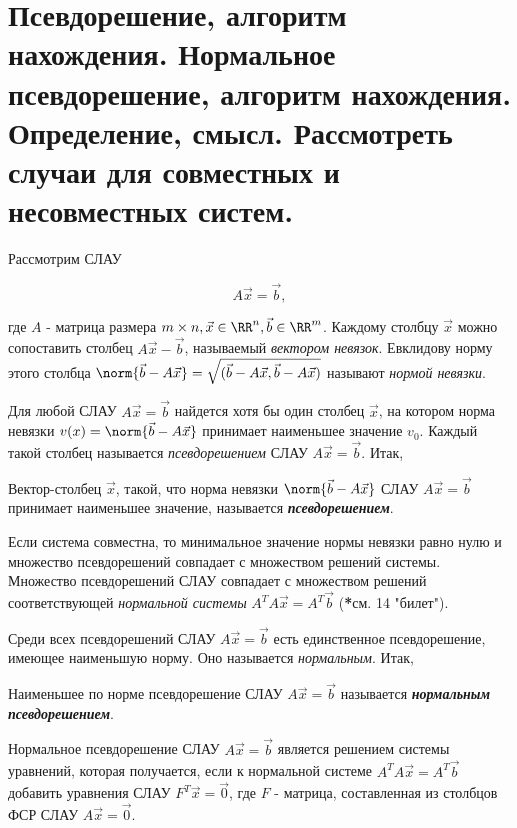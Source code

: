 \section{
    Псевдорешение, алгоритм нахождения. Нормальное псевдорешение, алгоритм нахождения. Определение, смысл. Рассмотреть случаи для совместных и несовместных систем.
}

Рассмотрим СЛАУ 

$$A\vec{x} = \vec{b},$$

где $A$ - матрица размера $m \times n, \vec{x} \in \RR^n, \vec{b} \in \RR^m$. Каждому столбцу $\vec{x}$ можно сопоставить столбец $A\vec{x} - \vec{b}$, называемый \textit{вектором невязок}. Евклидову норму этого столбца $\norm{\vec{b} - A\vec{x}} = \sqrt{(\vec{b} - A\vec{x}, \vec{b} - A\vec{x})}$ называют \textit{нормой невязки}.

Для любой СЛАУ $A\vec{x} = \vec{b}$ найдется хотя бы один столбец $\vec{x}$, на котором норма невязки $v(x) = \norm{\vec{b} - A\vec{x}}$ принимает наименьшее значение $v_0$. Каждый такой столбец называется \textit{псевдорешением} СЛАУ $A\vec{x} = \vec{b}$. Итак,

\begin{definition}
    Вектор-столбец $\vec{x}$, такой, что норма невязки $\norm{\vec{b} - A\vec{x}}$ СЛАУ $A\vec{x} = \vec{b}$ принимает наименьшее значение, называется \textit{\textbf{псевдорешением}}.
\end{definition}

Если система совместна, то минимальное значение нормы невязки равно нулю и множество псевдорешений совпадает с множеством решений системы. Множество псевдорешений СЛАУ совпадает с множеством решений соответствующей \textit{нормальной системы} $A^TA\vec{x} = A^T\vec{b}$ (\textbf{*}см. 14 "билет"). 

Среди всех псевдорешений СЛАУ $A\vec{x} = \vec{b}$ есть единственное псевдорешение, имеющее наименьшую норму. Оно называется \textit{нормальным}. Итак,

\begin{definition}
    Наименьшее по норме псевдорешение СЛАУ $A\vec{x} = \vec{b}$ называется \textbf{\textit{нормальным псевдорешением}}.
\end{definition}

Нормальное псевдорешение СЛАУ $A\vec{x} = \vec{b}$ является решением системы уравнений, которая получается, если к нормальной системе $A^TA\vec{x} = A^T\vec{b}$ добавить уравнения СЛАУ $F^T\vec{x} = \vec{0}$, где $F$ - матрица, составленная из столбцов ФСР СЛАУ $A\vec{x} = \vec{0}$.

